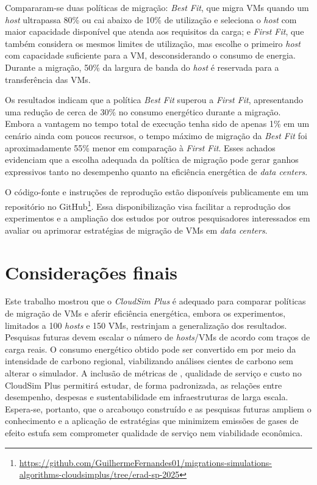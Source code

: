 \documentclass[12pt]{article}
\begin{document}
Compararam-se duas políticas de migração: \textit{Best Fit}, que migra VMs quando um \textit{host} ultrapassa 80\% ou cai abaixo de 10\% de utilização e seleciona o \textit{host} com maior capacidade disponível que atenda aos requisitos da carga; e \textit{First Fit}, que também considera os mesmos limites de utilização, mas escolhe o primeiro \textit{host} com capacidade suficiente para a VM, desconsiderando o consumo de energia. Durante a migração, 50\% da largura de banda do \textit{host} é reservada para a transferência das VMs.

Os resultados indicam que a política \textit{Best Fit} superou a \textit{First Fit}, apresentando uma redução de cerca de 30\% no consumo energético durante a migração. Embora a vantagem no tempo total de execução tenha sido de apenas 1\% em um cenário ainda com poucos recursos, o tempo máximo de migração da \textit{Best Fit} foi aproximadamente 55\% menor em comparação à \textit{First Fit}. Esses achados evidenciam que a escolha adequada da política de migração pode gerar ganhos expressivos tanto no desempenho quanto na eficiência energética de \textit{data centers}.

O código-fonte e instruções de reprodução estão disponíveis publicamente em um repositório no GitHub\footnote{\url{https://github.com/GuilhermeFernandes01/migrations-simulations-algorithms-cloudsimplus/tree/erad-sp-2025}}. Essa disponibilização visa facilitar a reprodução dos experimentos e a ampliação dos estudos por outros pesquisadores interessados em avaliar ou aprimorar estratégias de migração de VMs em \textit{data centers}.

\section{Considerações finais}
Este trabalho mostrou que o \textit{CloudSim Plus} é adequado para comparar políticas de migração de VMs e aferir eficiência energética, embora os experimentos, limitados a 100 \textit{hosts} e 150 VMs, restrinjam a generalização dos resultados. Pesquisas futuras devem escalar o número de \textit{hosts}/VMs de acordo com traços de carga reais. O consumo energético obtido pode ser convertido em  por meio da intensidade de carbono regional, viabilizando análises cientes de carbono sem alterar o simulador. A inclusão de métricas de , qualidade de serviço e custo no CloudSim Plus permitirá estudar, de forma padronizada, as relações entre desempenho, despesas e sustentabilidade em infraestruturas de larga escala. Espera-se, portanto, que o arcabouço construído e as pesquisas futuras ampliem o conhecimento e a aplicação de estratégias que minimizem emissões de gases de efeito estufa sem comprometer qualidade de serviço nem viabilidade econômica.
\end{document}
